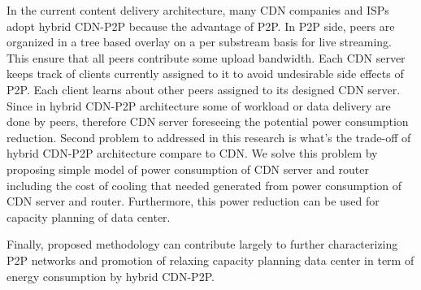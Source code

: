 In the current content delivery architecture, many CDN companies and ISPs adopt hybrid CDN-P2P because the advantage of P2P. 
In P2P side, peers are organized in a tree based overlay on a per substream basis for live streaming.   
This ensure that all peers contribute some upload bandwidth. 
Each CDN server keeps track of clients currently assigned to it to avoid undesirable side effects of P2P.
Each client learns about other peers assigned to its designed CDN server.
Since in hybrid CDN-P2P architecture some of workload or data delivery are done by peers, therefore CDN server foreseeing the potential power consumption reduction. 
Second problem to addressed in this research is what's the trade-off of hybrid CDN-P2P architecture compare to CDN.
We solve this problem by proposing simple model of power consumption of CDN server and router including the cost of cooling that needed generated from power consumption of CDN server and router. Furthermore, this power reduction can be used for capacity planning of data center. 

Finally, proposed methodology can contribute largely to further characterizing P2P networks and promotion of relaxing capacity planning data center in term of energy consumption by hybrid CDN-P2P. 


